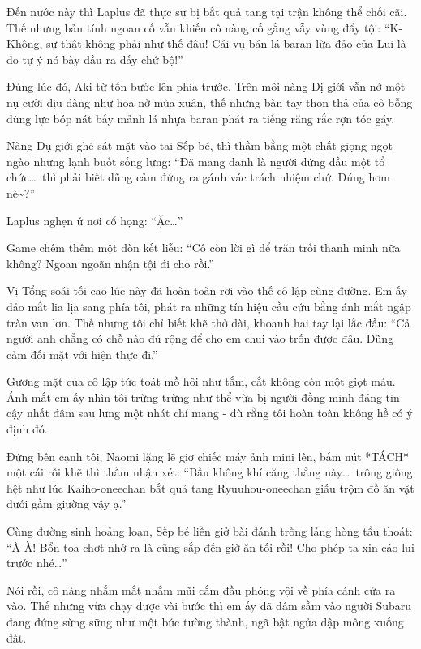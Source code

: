\documentclass[../main.tex]{subfiles}
\begin{document}

Đến nước này thì Laplus đã thực sự bị bắt quả tang tại trận không thể chối cãi. Thế nhưng bản tính ngoan cố vẫn khiến cô nàng cố gắng vẫy vùng đẩy tội: ``K-Không, sự thật không phải như thế đâu! Cái vụ bán lá baran lừa đảo của Lui là do tự ý nó bày đầu ra đấy chứ bộ!''

Đúng lúc đó, Aki từ tốn bước lên phía trước. Trên môi nàng Dị giới vẫn nở một nụ cười dịu dàng như hoa nở mùa xuân, thế nhưng bàn tay thon thả của cô bỗng dùng lực bóp nát bấy mảnh lá nhựa baran phát ra tiếng răng rắc rợn tóc gáy.


Nàng Dụ giới ghé sát mặt vào tai Sếp bé, thì thầm bằng một chất giọng ngọt ngào nhưng lạnh buốt sống lưng: ``Đã mang danh là người đứng đầu một tổ chức\dots\ thì phải biết dũng cảm đứng ra gánh vác trách nhiệm chứ. Đúng hơm nè\~{}?''

Laplus nghẹn ứ nơi cổ họng: ``Ặc\dots''

Game chêm thêm một đòn kết liễu: ``Cô còn lời gì để trăn trối thanh minh nữa không? Ngoan ngoãn nhận tội đi cho rồi.''

Vị Tổng soái tối cao lúc này đã hoàn toàn rơi vào thế cô lập cùng đường. Em ấy đảo mắt lia lịa sang phía tôi, phát ra những tín hiệu cầu cứu bằng ánh mắt ngập tràn van lơn. Thế nhưng tôi chỉ biết khẽ thở dài, khoanh hai tay lại lắc đầu: ``Cả người anh chẳng có chỗ nào đủ rộng để cho em chui vào trốn được đâu. Dũng cảm đối mặt với hiện thực đi.''

Gương mặt của cô lập tức toát mồ hôi như tắm, cắt không còn một giọt máu. Ánh mắt em ấy nhìn tôi trừng trừng như thể vừa bị người đồng minh đáng tin cậy nhất đâm sau lưng một nhát chí mạng - dù rằng tôi hoàn toàn không hề có ý định đó.

Đứng bên cạnh tôi, Naomi lặng lẽ giơ chiếc máy ảnh mini lên, bấm nút *TÁCH* một cái rồi khẽ thì thầm nhận xét: ``Bầu không khí căng thẳng này\dots\ trông giống hệt như lúc Kaiho-oneechan bắt quả tang Ryuuhou-oneechan giấu trộm đồ ăn vặt dưới gầm giường vậy ạ.''

Cùng đường sinh hoảng loạn, Sếp bé liền giở bài đánh trống lảng hòng tẩu thoát: ``À-À! Bổn tọa chợt nhớ ra là cũng sắp đến giờ ăn tối rồi! Cho phép ta xin cáo lui trước nhé\dots''

Nói rồi, cô nàng nhắm mắt nhắm mũi cắm đầu phóng vội về phía cánh cửa ra vào. Thế nhưng vừa chạy được vài bước thì em ấy đã đâm sầm vào người Subaru đang đứng sừng sững như một bức tường thành, ngã bật ngửa dập mông xuống đất.
\end{document}
